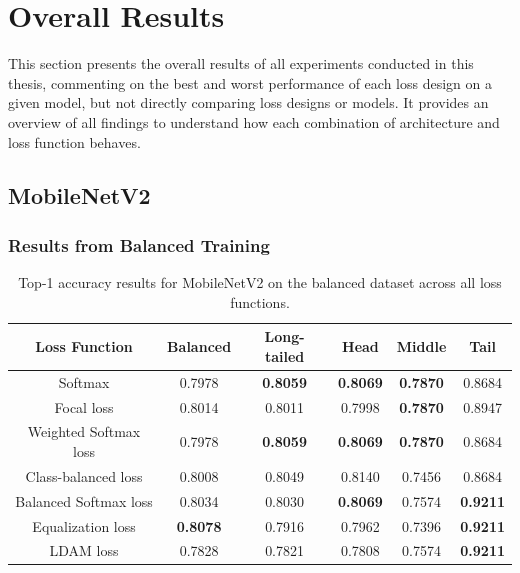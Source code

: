\section{Overall Results}
This section presents the overall results of all experiments conducted in this thesis, commenting on the best and worst performance of each loss design on a given model, but not directly comparing loss designs or models. It provides an overview of all findings to understand how each combination of architecture and loss function behaves.


\subsection{MobileNetV2}

\subsubsection{Results from Balanced Training}

\begin{table}[H]
    \centering
    \caption{Top-1 accuracy results for MobileNetV2 on the balanced dataset across all loss functions.}
    \begin{tabular}{cccccc}
        \toprule
        Loss Function & Balanced & Long-tailed & Head & Middle & Tail \\ 
        \midrule
        Softmax   & 0.7978   & \textbf{0.8059} & \textbf{0.8069} & \textbf{0.7870} & 0.8684 \\
        Focal loss   & 0.8014   & 0.8011 & 0.7998 & \textbf{0.7870} & 0.8947 \\
        Weighted Softmax loss   & 0.7978   & \textbf{0.8059} & \textbf{0.8069} & \textbf{0.7870} & 0.8684 \\
        Class-balanced loss   & 0.8008   & 0.8049 & 0.8140 & 0.7456 & 0.8684 \\
        Balanced Softmax loss   & 0.8034  & 0.8030 & \textbf{0.8069} & 0.7574 & \textbf{0.9211} \\
        Equalization loss   &  \textbf{0.8078}  & 0.7916 & 0.7962 & 0.7396 & \textbf{0.9211} \\
        LDAM loss   &  0.7828   & 0.7821 & 0.7808 & 0.7574 & \textbf{0.9211} \\
        \bottomrule
    \end{tabular}
    \label{tab:mobilenet_bal_acc1_1}
\end{table}

